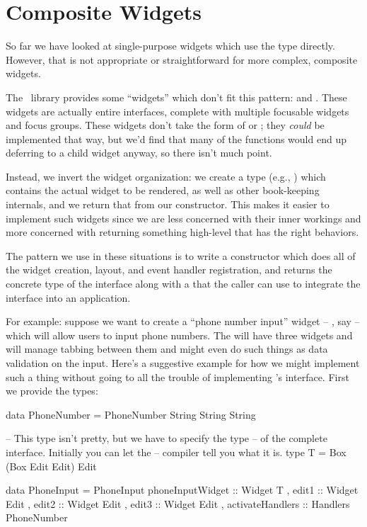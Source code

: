 \section{Composite Widgets}

So far we have looked at single-purpose widgets which use the
 type directly.  However, that is not appropriate or
straightforward for more complex, composite widgets.

The \vtyui\ library provides some ``widgets'' which don't fit this
pattern:  and .  These widgets are actually
entire interfaces, complete with multiple focusable widgets and focus
groups.  These widgets don't take the form of  or
; they \textit{could} be implemented that way,
but we'd find that many of the  functions would end up
deferring to a child widget anyway, so there isn't much point.

Instead, we invert the widget organization: we create a type (e.g.,
) which contains the actual widget to be rendered, as well
as other book-keeping internals, and we return that from our
constructor.  This makes it easier to implement such widgets since we
are less concerned with their inner workings and more concerned with
returning something high-level that has the right behaviors.

The pattern we use in these situations is to write a constructor which
does all of the widget creation, layout, and event handler
registration, and returns the concrete type of the interface along
with a  that the caller can use to integrate the
interface into an application.

For example: suppose we want to create a ``phone number input'' widget
-- , say -- which will allow users to input phone
numbers.  The  will have three  widgets and
will manage tabbing between them and might even do such things as data
validation on the input.  Here's a suggestive example for how we might
implement such a thing without going to all the trouble of
implementing 's interface.  First we provide the types:

\begin{haskellcode}
 data PhoneNumber = PhoneNumber String String String

 -- This type isn't pretty, but we have to specify the type
 -- of the complete interface.  Initially you can let the
 -- compiler tell you what it is.
 type T = Box (Box Edit Edit) Edit

 data PhoneInput =
   PhoneInput { phoneInputWidget :: Widget T
              , edit1 :: Widget Edit
              , edit2 :: Widget Edit
              , edit3 :: Widget Edit
              , activateHandlers :: Handlers PhoneNumber
              }
\end{haskellcode}

